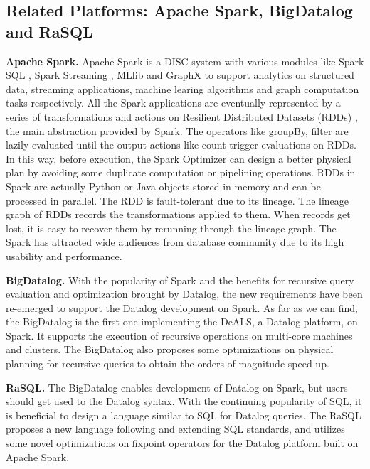\subsection{Related Platforms: Apache Spark, BigDatalog and RaSQL}
\textbf{Apache Spark.} Apache Spark is a DISC system with various modules like Spark SQL \citep{sparksql}, Spark Streaming \citep{sparkstreaming}, MLlib \citep{meng2016mllib} and GraphX \citep{gonzalez2014graphx} to support analytics on structured data, streaming applications, machine learing algorithms and graph computation tasks respectively.  All the Spark applications are eventually represented by a series of transformations and actions on Resilient Distributed Datasets (RDDs) \citep{dean2004mapreduce}, the main abstraction provided by Spark. The operators like groupBy, filter are lazily evaluated until the output actions like count trigger evaluations on RDDs. In this way, before execution, the Spark Optimizer can design a better physical plan by avoiding some duplicate computation or pipelining operations. RDDs in Spark are actually Python or Java objects stored in memory and can be processed in parallel. The RDD is fault-tolerant due to its lineage. The lineage graph of RDDs records the transformations applied to them. When records get lost, it is easy to recover them by rerunning through the lineage graph. The Spark has attracted wide audiences from database community due to its high usability and performance.

\textbf{BigDatalog.}
With the popularity of Spark and the benefits for recursive query evaluation and optimization brought by Datalog, the new requirements have been re-emerged to support the Datalog development on Spark. 
As far as we can find, the BigDatalog \citep{shkapsky2016big} is the first one implementing the DeALS, a Datalog platform, on Spark. It supports the execution of recursive operations on  multi-core machines and clusters. The BigDatalog also proposes some optimizations on physical planning for recursive queries to obtain the orders of magnitude speed-up. 

\textbf{RaSQL.} 
The BigDatalog enables development of Datalog on Spark, but users should get used to the Datalog syntax. With the continuing popularity of SQL, it is beneficial to design a language similar to SQL for Datalog queries. The RaSQL \citep{gu2019rasql} proposes a new language following and extending SQL standards, and utilizes some novel optimizations on fixpoint operators for the Datalog platform built on Apache Spark.  

